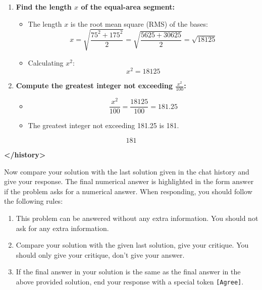 \begin{tcolorbox}[
  title=Multiagent Collaborative Reasoning Trace Data Sample,
  breakable,
  colback=white,
  colframe=black
]
\begin{enumerate}
  \item \textbf{Find the length \( x \) of the equal-area segment:}
  \begin{itemize}
    \item The length \( x \) is the root mean square (RMS) of the bases:
    \[
    x = \sqrt{\frac{75^2 + 175^2}{2}} = \sqrt{\frac{5625 + 30625}{2}} = \sqrt{18125}
    \]
    \item Calculating \( x^2 \):
    \[
    x^2 = 18125
    \]
  \end{itemize}

  \item \textbf{Compute the greatest integer not exceeding \( \frac{x^2}{100} \):}
  \begin{itemize}
    \item 
    \[
    \frac{x^2}{100} = \frac{18125}{100} = 181.25
    \]
    \item The greatest integer not exceeding 181.25 is 181.
  \end{itemize}

\end{enumerate}

\[
\boxed{181}
\]

\textbf{\textless /history\textgreater}

Now compare your solution with the last solution given in the chat history and give your response. The final numerical answer is highlighted in the form \( \boxed{\text{answer}} \) if the problem asks for a numerical answer. When responding, you should follow the following rules:

\begin{enumerate}
    \item This problem can be answered without any extra information. You should not ask for any extra information.
    \item Compare your solution with the given last solution, give your critique. You should only give your critique, don't give your answer.
    \item If the final answer in your solution is the same as the final answer in the above provided solution, end your response with a special token \texttt{[Agree]}.
\end{enumerate}




\end{tcolorbox}
